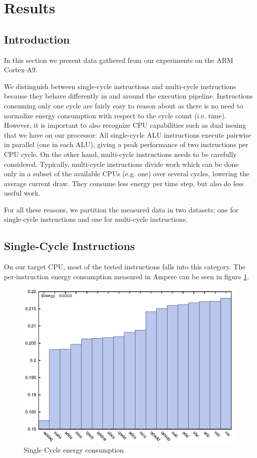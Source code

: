 \section{Results}

\subsection{Introduction}
In this section we present data gathered from our experiments on the ARM
Cortex-A9.

We distinguish between single-cycle instructions and multi-cycle instructions
because they behave differently in and around the execution pipeline.
Instructions consuming only one cycle are fairly easy to reason about as there
is no need to normalize energy consumption with respect to the cycle count (i.e.
time). However, it is important to also recognize CPU capabilities such as dual
issuing that we have on our processor: All single-cycle ALU instructions execute
pairwise in parallel (one in each ALU), giving a peak performance of two
instructions per CPU cycle. On the other hand, multi-cycle instructions needs to
be carefully considered. Typically, multi-cycle instructions divide work which
can be done only in a subset of the available CPUs (e.g. one) over several
cycles, lowering the average current draw. They consume less energy per
time step, but also do less useful work.

For all these reasons, we partition the measured data in two datasets; one for
single-cycle instructions and one for multi-cycle instructions.

\subsection{Single-Cycle Instructions}
On our target CPU, most of  the tested instructions falls into
this category. The per-instruction energy consumption measured in Ampere can be
seen in figure \ref{fig:singlecycle}.

\begin{figure}
    \includegraphics[width=\textwidth/2]{figures/single-cycle}
    \caption{Single Cycle energy consumption}
    \label{fig:singlecycle}
\end{figure}

